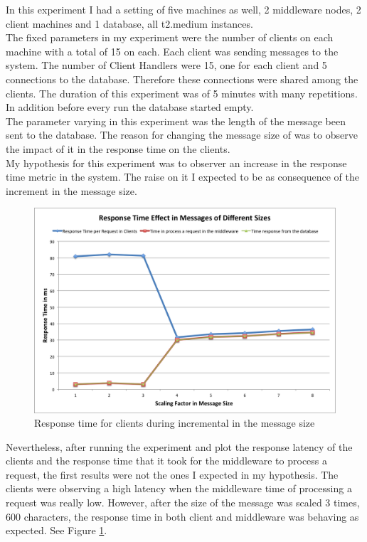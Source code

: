 In this experiment I had a setting of five machines as well, 2 middleware nodes, 2 client machines and 1 database, all t2.medium instances.\\

The fixed parameters in my experiment were the number of clients on each machine with a total of 15 on each. Each client was sending messages to the system. The number of Client Handlers were 15, one for each client and 5 connections to the database. Therefore these connections were shared among the clients. The duration of this experiment was of 5 minutes with many repetitions. In addition before every run the database started empty.\\

The parameter varying in this experiment was the length of the message been sent to the database. The reason for changing the message size of was to observe the impact of it in the response time on the clients.\\

My hypothesis for this experiment was to observer an increase in the response time metric in the system. The raise on it I expected to be as consequence of the increment in the message size.\\
 
 \begin{figure}[h!]
 	\centering
 	\includegraphics[scale=0.4]{response.png}
 	\caption{Response time for clients during incremental in the message size}
 	\label{response}
 \end{figure}
 
Nevertheless, after running the experiment and plot the response latency of the clients and the response time that it took for the middleware to process a request, the first results were not the ones I expected in my hypothesis. The clients were observing a high latency when the middleware time of processing a request was really low. However, after the size of the message was scaled 3 times, 600 characters, the response time in both client and middleware was behaving as expected. See Figure \ref{response}.\\

